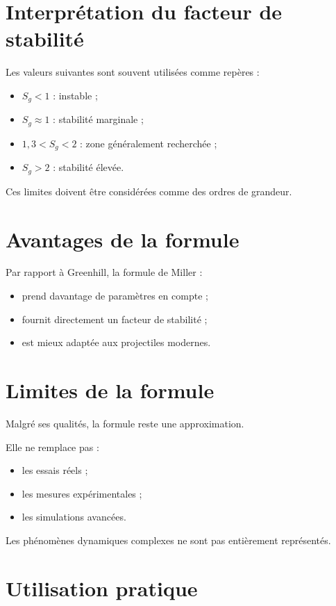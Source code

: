 \section{Interprétation du facteur de stabilité}

Les valeurs suivantes sont souvent utilisées comme repères :

\begin{itemize}
    \item $S_g < 1$ : instable ;
    \item $S_g \approx 1$ : stabilité marginale ;
    \item $1,3 < S_g < 2$ : zone généralement recherchée ;
    \item $S_g > 2$ : stabilité élevée.
\end{itemize}

Ces limites doivent être considérées comme des ordres de grandeur.

\section{Avantages de la formule}

Par rapport à Greenhill, la formule de Miller :

\begin{itemize}
    \item prend davantage de paramètres en compte ;
    \item fournit directement un facteur de stabilité ;
    \item est mieux adaptée aux projectiles modernes.
\end{itemize}

\section{Limites de la formule}

Malgré ses qualités, la formule reste une approximation.

Elle ne remplace pas :

\begin{itemize}
    \item les essais réels ;
    \item les mesures expérimentales ;
    \item les simulations avancées.
\end{itemize}

Les phénomènes dynamiques complexes ne sont pas entièrement représentés.

\section{Utilisation pratique}

